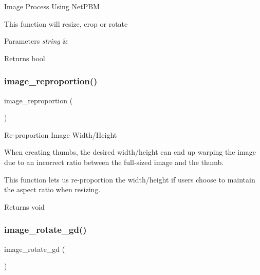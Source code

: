 Image Process Using Net\+P\+BM

This function will resize, crop or rotate


\begin{DoxyParams}{Parameters}
{\em string} & \\
\hline
\end{DoxyParams}
\begin{DoxyReturn}{Returns}
bool 
\end{DoxyReturn}
\mbox{\label{class_c_i___image__lib_a55ee590fb313c50e99d6c1d4cd9618d2}} 
\subsubsection{\texorpdfstring{image\+\_\+reproportion()}{image\_reproportion()}}
{\footnotesize\ttfamily image\+\_\+reproportion (\begin{DoxyParamCaption}{ }\end{DoxyParamCaption})}

Re-\/proportion Image Width/\+Height

When creating thumbs, the desired width/height can end up warping the image due to an incorrect ratio between the full-\/sized image and the thumb.

This function lets us re-\/proportion the width/height if users choose to maintain the aspect ratio when resizing.

\begin{DoxyReturn}{Returns}
void 
\end{DoxyReturn}
\mbox{\label{class_c_i___image__lib_ae0d52ef7503342a0a1c56c99da140446}} 
\subsubsection{\texorpdfstring{image\+\_\+rotate\+\_\+gd()}{image\_rotate\_gd()}}
{\footnotesize\ttfamily image\+\_\+rotate\+\_\+gd (\begin{DoxyParamCaption}{ }\end{DoxyParamCaption})}

